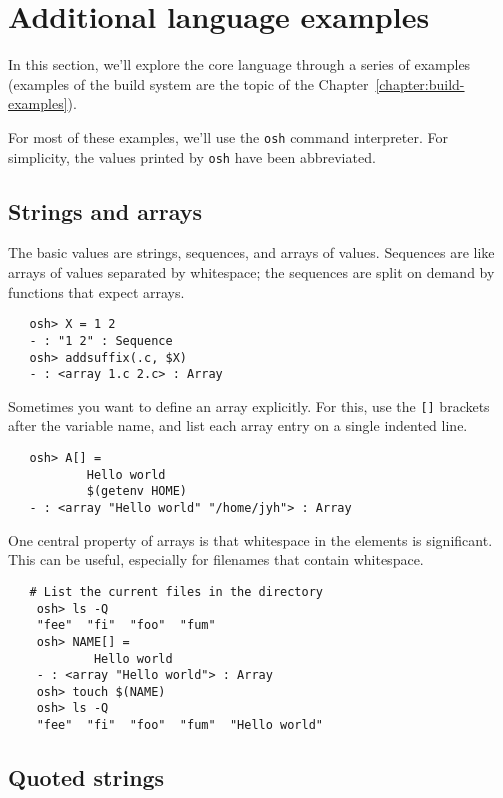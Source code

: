 %
%
\chapter{Additional language examples}
\label{chapter:language-examples}

In this section, we'll explore the core language through a series of examples (examples of the build
system are the topic of the Chapter~\ref{chapter:build-examples}).

For most of these examples, we'll use the \verb+osh+ command interpreter.  For simplicity, the
values printed by \verb+osh+ have been abbreviated.

\section{Strings and arrays}

The basic \OMake{} values are strings, sequences, and arrays of values.  Sequences are like arrays of
values separated by whitespace; the sequences are split on demand by functions that expect arrays.

\begin{verbatim}
   osh> X = 1 2
   - : "1 2" : Sequence
   osh> addsuffix(.c, $X)
   - : <array 1.c 2.c> : Array
\end{verbatim}

Sometimes you want to define an array explicitly.  For this, use the \verb+[]+ brackets after the
variable name, and list each array entry on a single indented line.

\begin{verbatim}
   osh> A[] =
           Hello world
           $(getenv HOME)
   - : <array "Hello world" "/home/jyh"> : Array
\end{verbatim}

One central property of arrays is that whitespace in the elements is significant.  This can be
useful, especially for filenames that contain whitespace. 

\begin{verbatim}
   # List the current files in the directory
    osh> ls -Q
    "fee"  "fi"  "foo"  "fum"
    osh> NAME[] = 
            Hello world
    - : <array "Hello world"> : Array
    osh> touch $(NAME)
    osh> ls -Q
    "fee"  "fi"  "foo"  "fum"  "Hello world"
\end{verbatim}     

\section{Quoted strings}  


